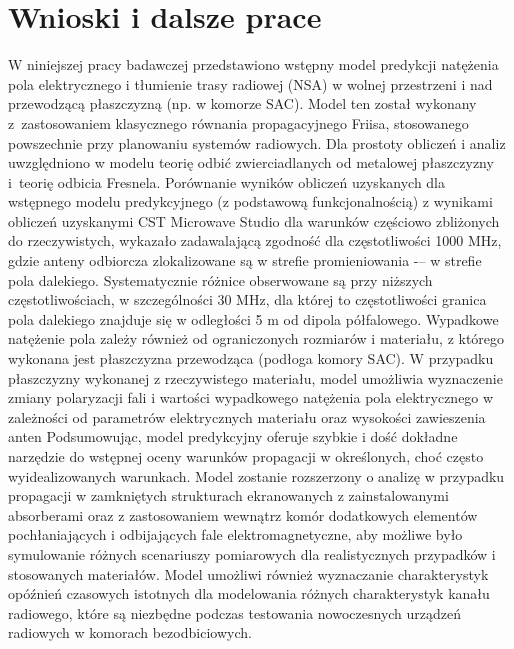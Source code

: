\section{Wnioski i dalsze prace} 
\label{sec:17_wnioski}
W niniejszej pracy badawczej przedstawiono wstępny model predykcji natężenia pola elektrycznego i tłumienie trasy radiowej (NSA) w wolnej przestrzeni i nad przewodzącą płaszczyzną (np. w komorze SAC). Model ten został wykonany z~zastosowaniem klasycznego równania propagacyjnego Friisa, stosowanego powszechnie przy planowaniu systemów radiowych. Dla prostoty obliczeń i analiz uwzględniono w modelu teorię odbić zwierciadlanych od metalowej płaszczyzny i~teorię odbicia Fresnela. Porównanie wyników obliczeń uzyskanych dla wstępnego modelu predykcyjnego (z podstawową funkcjonalnością) z wynikami obliczeń uzyskanymi CST Microwave Studio dla warunków częściowo zbliżonych do rzeczywistych, wykazało zadawalającą zgodność dla częstotliwości 1000 MHz, gdzie anteny odbiorcza zlokalizowane są w strefie promieniowania -– w strefie pola dalekiego. Systematycznie różnice obserwowane są przy niższych częstotliwościach, w szczególności 30 MHz, dla której to częstotliwości  granica pola dalekiego znajduje się w odległości 5 m od dipola półfalowego. Wypadkowe natężenie pola zależy również od ograniczonych rozmiarów i materiału, z którego wykonana jest płaszczyzna przewodząca (podłoga komory SAC).
W przypadku płaszczyzny wykonanej z rzeczywistego materiału, model umożliwia wyznaczenie zmiany polaryzacji fali i wartości wypadkowego natężenia pola elektrycznego w zależności od parametrów elektrycznych materiału oraz wysokości zawieszenia anten 
Podsumowując, model predykcyjny oferuje szybkie i dość dokładne narzędzie do wstępnej oceny warunków propagacji w określonych, choć często wyidealizowanych warunkach. Model zostanie rozszerzony o analizę w przypadku propagacji w zamkniętych strukturach ekranowanych z zainstalowanymi absorberami oraz z zastosowaniem wewnątrz komór dodatkowych elementów pochłaniających i odbijających fale elektromagnetyczne, aby możliwe było symulowanie różnych scenariuszy pomiarowych dla realistycznych przypadków i stosowanych materiałów. Model umożliwi również wyznaczanie charakterystyk opóźnień czasowych istotnych dla modelowania różnych charakterystyk kanału radiowego, które są niezbędne podczas testowania nowoczesnych urządzeń radiowych w komorach bezodbiciowych.




